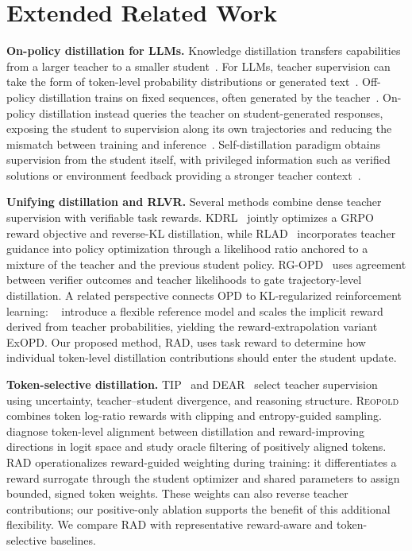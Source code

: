 \documentclass{article} %
\begin{document}
\FloatBarrier
\section{Extended Related Work}
\label{app:extended-related-work}
\noindent\textbf{On-policy distillation for LLMs.}\enspace
Knowledge distillation transfers capabilities from a larger teacher to a smaller student~\citep{buciluǎ2006model,hinton2015distilling}. For LLMs, teacher supervision can take the form of token-level probability distributions or generated text~\citep{kim2016sequence, sanh2020distilbertdistilledversionbert}. Off-policy distillation trains on fixed sequences, often generated by the teacher~\citep{hsieh-etal-2023-distilling, li-etal-2025-bild}. On-policy distillation instead queries the teacher on student-generated responses, exposing the student to supervision along its own trajectories and reducing the mismatch between training and inference~\citep{agarwal2024policy,gu2024minillm}. Self-distillation paradigm obtains supervision from the student itself, with privileged information such as verified solutions or environment feedback providing a stronger teacher context~\citep{shenfeld2026self,hubotter2026reinforcement,zhao2026self}.

\noindent\textbf{Unifying distillation and RLVR.}\enspace
Several methods combine dense teacher supervision with verifiable task rewards. KDRL~\citep{xu2025kdrl} jointly optimizes a GRPO reward objective and reverse-KL distillation, while RLAD~\citep{zhang2026reinforcement} incorporates teacher guidance into policy optimization through a likelihood ratio anchored to a mixture of the teacher and the previous student policy. RG-OPD~\citep{rgopd} uses agreement between verifier outcomes and teacher likelihoods to gate trajectory-level distillation. A related perspective connects OPD to KL-regularized reinforcement learning: ~\cite{yang2026learning} introduce a flexible reference model and scales the implicit reward derived from teacher probabilities, yielding the reward-extrapolation variant ExOPD. Our proposed method, RAD, uses task reward to determine how individual token-level distillation contributions should enter the student update.

\noindent\textbf{Token-selective distillation.}\enspace
TIP~\citep{xu2026tip} and DEAR~\citep{xiao2026finding} select teacher supervision using uncertainty, teacher--student divergence, and reasoning structure. \textsc{Reopold}~\citep{ko2026scalingreasoningefficientlyrelaxed} combines token log-ratio rewards with clipping and entropy-guided sampling. \citet{armandpour2026unmasking} diagnose token-level alignment between distillation and reward-improving directions in logit space and study oracle filtering of positively aligned tokens. RAD operationalizes reward-guided weighting during training: it differentiates a reward surrogate through the student optimizer and shared parameters to assign bounded, signed token weights. These weights can also reverse teacher contributions; our positive-only ablation supports the benefit of this additional flexibility. We compare RAD with representative reward-aware and token-selective baselines.
\end{document}
